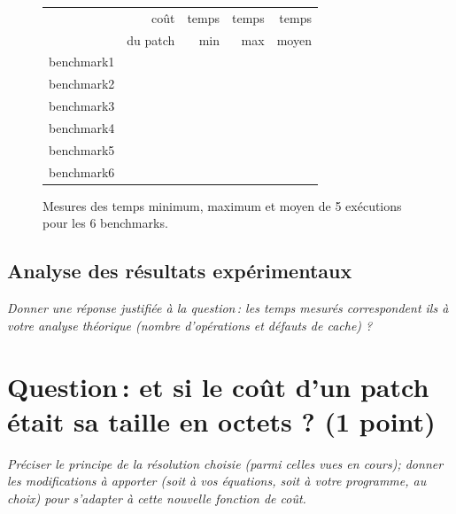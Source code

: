 \documentclass[a4paper, 10pt, french]{article}
\begin{document}
    \begin{figure}[h]
      \begin{center}
        \begin{tabular}{|l||r||r|r|r||}
          \hline
          \hline
            & coût         & temps     & temps   & temps \\
            & du patch     & min       & max     & moyen \\
          \hline
          \hline
            benchmark1 &      &     &     &     \\
          \hline
            benchmark2 &      &     &     &     \\
          \hline
            benchmark3 &      &     &     &     \\
          \hline
            benchmark4 &      &     &     &     \\
          \hline
            benchmark5 &      &     &     &     \\
          \hline
            benchmark6 &      &     &     &     \\
          \hline
          \hline
        \end{tabular}
        \caption{Mesures des temps minimum, maximum et moyen de 5 exécutions pour les 6 benchmarks.}
        \label{table-temps}
      \end{center}
    \end{figure}

\subsection{Analyse des résultats expérimentaux}
{\em Donner  une réponse justifiée  à la question\,: 
              les  temps mesurés correspondent ils  à votre analyse théorique (nombre d’opérations et défauts de cache) ?
}

\section{Question\,: et  si le coût d'un patch était sa taille en octets ? (1 point)}
{\em Préciser le principe de la résolution choisie (parmi celles vues en cours); donner  les modifications à apporter (soit à vos  équations, soit à votre programme, au choix) 
pour s'adapter à cette nouvelle fonction de coût. 
}
\end{document}
